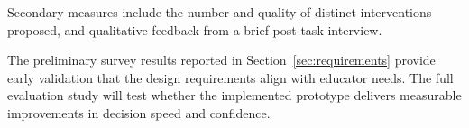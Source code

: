 \documentclass[11pt]{article}
\begin{document}
Secondary measures include the number and quality of distinct interventions proposed, and qualitative feedback from a brief post-task interview.

The preliminary survey results reported in Section~\ref{sec:requirements} provide early validation that the design requirements align with educator needs. The full evaluation study will test whether the implemented prototype delivers measurable improvements in decision speed and confidence.


\end{document}

